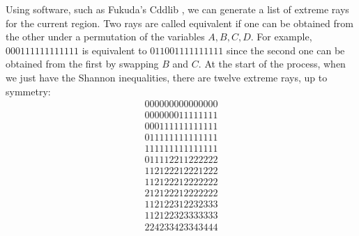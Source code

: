 \documentclass[10pt,journal]{IEEEtran}
\begin{document}
Using software, such as Fukuda's Cddlib \cite{cddlib}, we can generate a list
of extreme rays for the current region.  Two rays are called
equivalent if one can be obtained from the other under a permutation of the variables $A,B,C,D$.
For example, $0 0 0 1 1 1 1 1 1 1 1 1 1 1 1$ is equivalent to $0 1 1 0 0 1 1 1 1 1 1 1 1 1 1$
since the second one can be obtained from the first by swapping $B$ and $C$.
At the start of the process, when we just have the Shannon inequalities, there are twelve extreme rays, up to symmetry:
\begin{eqnarray*}
 0 0 0 0 0 0 0 0 0 0 0 0 0 0 0\\
 0 0 0 0 0 0 0 1 1 1 1 1 1 1 1\\
 0 0 0 1 1 1 1 1 1 1 1 1 1 1 1\\
 0 1 1 1 1 1 1 1 1 1 1 1 1 1 1\\
 1 1 1 1 1 1 1 1 1 1 1 1 1 1 1\\
 0 1 1 1 1 2 2 1 1 2 2 2 2 2 2\\
 1 1 2 1 2 2 2 1 2 2 2 1 2 2 2\\
 1 1 2 1 2 2 2 1 2 2 2 2 2 2 2\\
 2 1 2 1 2 2 2 1 2 2 2 2 2 2 2\\
 1 1 2 1 2 2 3 1 2 2 3 2 3 3 3\\
 1 1 2 1 2 2 3 2 3 3 3 3 3 3 3\\
 2 2 4 2 3 3 4 2 3 3 4 3 4 4 4
\end{eqnarray*}
\end{document}
